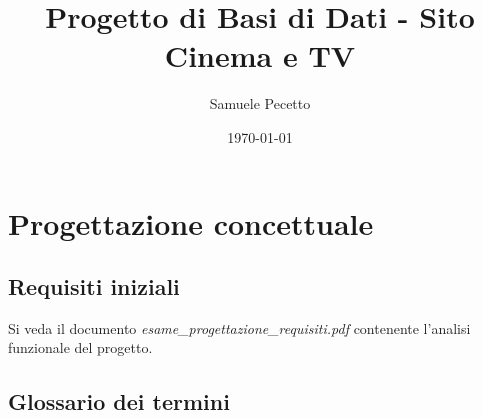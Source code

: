 \documentclass[a4paper]{article}
\title{Progetto di Basi di Dati - Sito Cinema e TV}
\author{Samuele Pecetto}
\date{\today}
\begin{document}
\maketitle
\newpage
\tableofcontents
\newpage

\section{Progettazione concettuale}
\filbreak
\subsection{Requisiti iniziali}

Si veda il documento \emph{esame\_progettazione\_requisiti.pdf} contenente l'analisi funzionale del progetto.\\

\subsection{Glossario dei termini}

\end{document}
